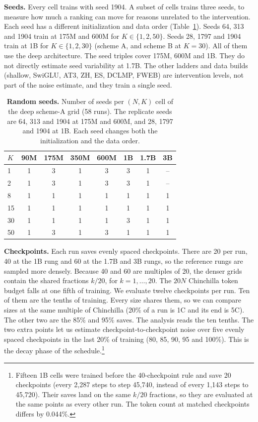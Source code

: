 \textbf{Seeds.} Every cell trains with seed 1904. A subset of cells trains three seeds, to measure how much a ranking can move for reasons unrelated to the intervention. Each seed has a different initialization and data order (Table~\ref{tab:grid}). Seeds 64, 313 and 1904 train at 175M and 600M for $K \in \{1, 2, 50\}$. Seeds 28, 1797 and 1904 train at 1B for $K \in \{1, 2, 30\}$ (scheme A, and scheme B at $K=30$). All of them use the deep architecture. The seed triples cover 175M, 600M and 1B. They do not directly estimate seed variability at 1.7B. The other ladders and data builds (shallow, SwiGLU, AT3, ZH, ES, DCLMP, FWEB) are intervention levels, not part of the noise estimate, and they train a single seed.

\begin{table}[t]
\centering
\small
\begin{tabular}{lccccccc}
\toprule
$K$ & 90M & 175M & 350M & 600M & 1B & 1.7B & 3B \\
\midrule
1 & 1 & 3 & 1 & 3 & 3 & 1 & -- \\
2 & 1 & 3 & 1 & 3 & 3 & 1 & -- \\
8 & 1 & 1 & 1 & 1 & 1 & 1 & 1 \\
15 & 1 & 1 & 1 & 1 & 1 & 1 & 1 \\
30 & 1 & 1 & 1 & 1 & 3 & 1 & 1 \\
50 & 1 & 3 & 1 & 3 & 1 & 1 & 1 \\
\bottomrule
\end{tabular}
\caption{\textbf{Random seeds.} Number of seeds per $(N, K)$ cell of the deep scheme-A grid (58 runs). The replicate seeds are 64, 313 and 1904 at 175M and 600M, and 28, 1797 and 1904 at 1B. Each seed changes both the initialization and the data order.}
\label{tab:grid}
\end{table}

\textbf{Checkpoints.} Each run saves evenly spaced checkpoints. There are 20 per run, 40 at the 1B rung and 60 at the 1.7B and 3B rungs, so the reference rungs are sampled more densely. Because 40 and 60 are multiples of 20, the denser grids contain the shared fractions $k/20$, for $k=1,\ldots,20$. The $20N$ Chinchilla token budget falls at one fifth of training. We evaluate twelve checkpoints per run. Ten of them are the tenths of training. Every size shares them, so we can compare sizes at the same multiple of Chinchilla (20\% of a run is 1C and its end is 5C). The other two are the 85\% and 95\% saves. The analysis reads the ten tenths. The two extra points let us estimate checkpoint-to-checkpoint noise over five evenly spaced checkpoints in the last 20\% of training (80, 85, 90, 95 and 100\%). This is the decay phase of the schedule.\footnote{Fifteen 1B cells were trained before the 40-checkpoint rule and save 20 checkpoints (every 2,287 steps to step 45,740, instead of every 1,143 steps to 45,720). Their saves land on the same $k/20$ fractions, so they are evaluated at the same points as every other run. The token count at matched checkpoints differs by 0.044\%.}

